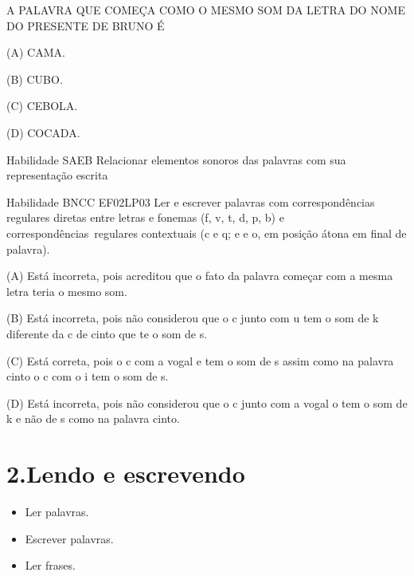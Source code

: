{\protect\hypertarget{_Hlk129112871}{}{}A PALAVRA QUE COMEÇA COMO O MESMO
SOM DA LETRA DO NOME DO PRESENTE DE BRUNO É

(A) CAMA.

(B) CUBO.

(C) CEBOLA.

(D) COCADA.

\protect\hypertarget{_Hlk128577260}{}{}Habilidade SAEB Relacionar
elementos sonoros das palavras com sua representação escrita

\protect\hypertarget{_Hlk129112702}{}{}Habilidade BNCC EF02LP03 Ler e
escrever palavras com correspondências regulares diretas entre letras e
fonemas (f, v, t, d, p, b) e correspondências~regulares contextuais (c e
q; e e o, em posição átona em final de palavra).

(A) Está incorreta, pois acreditou que o fato da palavra começar com a
mesma letra teria o mesmo som.

(B) Está incorreta, pois não considerou que o c junto com u tem o som de
k diferente da c de cinto que te o som de s.

(C) Está correta, pois o c com a vogal e tem o som de s assim como na
palavra cinto o c com o i tem o som de s.

(D) Está incorreta, pois não considerou que o c junto com a vogal o tem
o som de k e não de s como na palavra cinto.

\chapter{2.Lendo e escrevendo}



\begin{itemize}
\item 
Ler palavras.
\item 
Escrever palavras.
\item 
Ler frases.
\end{itemize}

}
